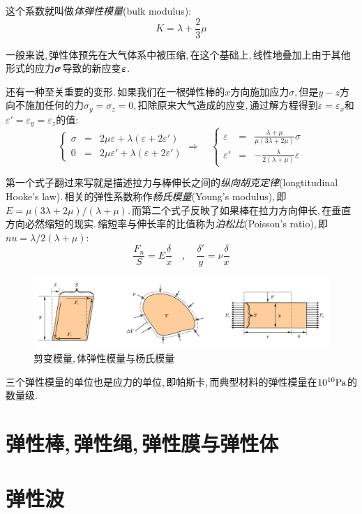 这个系数就叫做\emph{体弹性模量}(bulk modulus):
\[K=\lambda+\frac{2}{3}\mu\]

一般来说,\,弹性体预先在大气体系中被压缩,\,在这个基础上,\,线性地叠加上由于其他形式的应力$\boldsymbol{\sigma}$导致的新应变$\boldsymbol{\varepsilon}$.\,

还有一种至关重要的变形.\,如果我们在一根弹性棒的$x$方向施加应力$\sigma$,\,但是$y-z$方向不施加任何的力$\sigma_y=\sigma_z=0$,\,扣除原来大气造成的应变,\,通过解方程得到$\varepsilon=\varepsilon_x$和$\varepsilon'=\varepsilon_y=\varepsilon_z$的值:
\[\left\{\begin{array}{ccc}\sigma &=&2\mu\varepsilon + \lambda(\varepsilon+2\varepsilon') \\ 0 &=&2\mu\varepsilon' + \lambda(\varepsilon+2\varepsilon')\end{array}\right.\Rightarrow\quad \left\{\begin{array}{ccc}\varepsilon &=& \frac{\lambda+\mu}{\mu(3\lambda+2\mu)} \sigma\\ \varepsilon' &=&-\frac{\lambda}{2(\lambda+\mu)}\varepsilon\end{array}\right.\]

第一个式子翻过来写就是描述拉力与棒伸长之间的\emph{纵向胡克定律}(longtitudinal Hooke's law).\,相关的弹性系数称作\emph{杨氏模量}(Young's modulus),\,即$E=\mu(3\lambda+2\mu)/(\lambda+\mu)$.\,而第二个式子反映了如果棒在拉力方向伸长,\,在垂直方向必然缩短的现实.\,缩短率与伸长率的比值称为\emph{泊松比}(Poisson's ratio),\,即$nu=\lambda/2(\lambda+\mu)$:
\[\frac{F_n}{S}=E\frac{\delta}{x}\quad ,\quad \frac{\delta'}{y}=\nu\frac{\delta}{x}\]

\begin{figure}[H]
\centering
\includegraphics[width=14cm]{image/6-7-3.png}
\caption{剪变模量,\,体弹性模量与杨氏模量}
\end{figure}

三个弹性模量的单位也是应力的单位,\,即帕斯卡,\,而典型材料的弹性模量在$10^{10}{\rm Pa}$的数量级.


\section{弹性棒,\,弹性绳,\,弹性膜与弹性体}

\section{弹性波}

